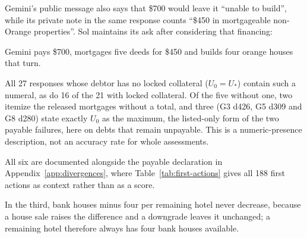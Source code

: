 Gemini's public message also says that \$700 would leave it ``unable to build'', while its private note in the same response counts ``\$450 in mortgageable non-Orange properties''. Sol maintains its ask after considering that financing:

Gemini pays \$700, mortgages five deeds for \$450 and builds four orange houses that turn.

All 27 responses whose debtor has no locked collateral ($U_0=U_*$) contain such a numeral, as do 16 of the 21 with locked collateral. Of the five without one, two itemize the released mortgages without a total, and three (G3 d426, G5 d309 and G8 d280) state exactly $U_0$ as the maximum, the listed-only form of the two payable failures, here on debts that remain unpayable. This is a numeric-presence description, not an accuracy rate for whole assessments.

All six are documented alongside the payable declaration in Appendix~\ref{app:divergences}, where Table~\ref{tab:first-actions} gives all 188 first actions as context rather than as a score.

In the third, bank houses minus four per remaining hotel never decrease, because a house sale raises the difference and a downgrade leaves it unchanged; a remaining hotel therefore always has four bank houses available.

